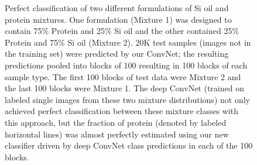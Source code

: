 \documentclass[%
reprint,
superscriptaddress,
 aps,
 pre,
]{revtex4-1}
\begin{document}
\begin{figure} [htb]
\begin{minipage}[b]{.99\linewidth}
    \end{minipage}
    \caption{\footnotesize Perfect classification of two different formulations of Si oil and protein mixtures.  One formulation (Mixture 1) was designed to contain 75\% Protein and 25\% Si oil  and the other   contained 25\% Protein and 75\% Si oil (Mixture 2). 20K test samples (images not in the training set) were predicted by our ConvNet;  the resulting predictions pooled into blocks of 100 resulting in 100 blocks of each sample type.  The first 100 blocks of test data were Mixture 2 and the last 100 blocks were Mixture 1.  The deep ConvNet (trained on labeled single images from these two mixture distributions) not only achieved perfect classification between these mixture classes with this approach, but
    the fraction of protein (denoted by labeled horizontal lines) was almost perfectly estimated  using our new classifier driven by deep ConvNet class predictions in each of the 100 blocks.} 
      \label{fig:mixpredict}
\end{figure}
\end{document}
